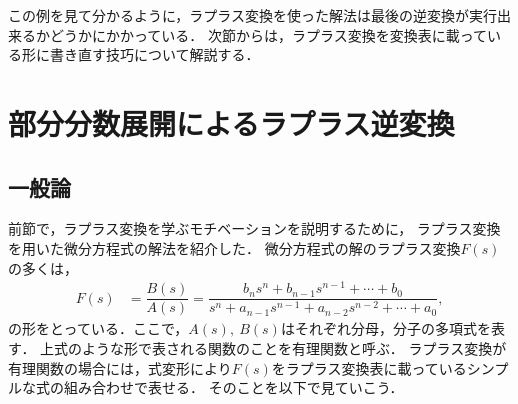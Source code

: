 この例を見て分かるように，ラプラス変換を使った解法は最後の逆変換が実行出来るかどうかにかかっている．
次節からは，ラプラス変換を変換表に載っている形に書き直す技巧について解説する．
%
\newpage
%
%
%
%
\section{部分分数展開によるラプラス逆変換}
%
\subsection{一般論}
%
前節で，ラプラス変換を学ぶモチベーションを説明するために，
ラプラス変換を用いた微分方程式の解法を紹介した．
微分方程式の解のラプラス変換$F(s)$の多くは，
\begin{align}
 F\left(s\right) & =\dfrac{B\left(s\right)}{A\left(s\right)}=\dfrac{b_{n}s^{n}+b_{n-1}s^{n-1}+\cdots+b_{0}}{s^{n}+a_{n-1}s^{n-1}+a_{n-2}s^{n-2}+\cdots+a_{0}},
\end{align}
の形をとっている．ここで，$A(s),~B(s)$はそれぞれ分母，分子の多項式を表す．
上式のような形で表される関数のことを有理関数と呼ぶ．
ラプラス変換が有理関数の場合には，式変形により$F(s)$をラプラス変換表に載っているシンプルな式の組み合わせで表せる．
そのことを以下で見ていこう．


